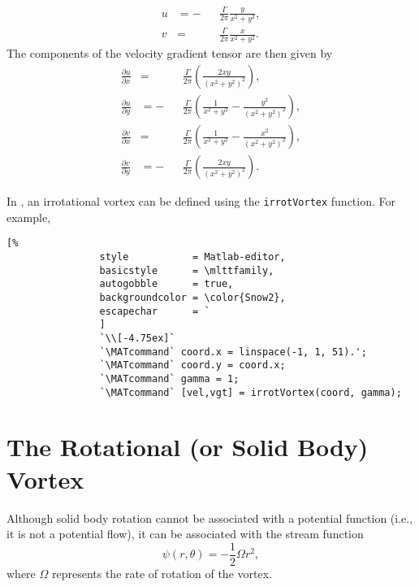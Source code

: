\documentclass[10pt, twoside]{book}
\begin{document}
			\begin{subequations}
				\label{eq:IrrotVortexVel}
				\begin{alignat}{2}
					u &= -&&\frac{\Gamma}{2\pi}\frac{y}{x^2 + y^2},\label{eq:IrrotVortexVelPolarU}\\
					v &=  &&\frac{\Gamma}{2\pi}\frac{x}{x^2 + y^2}.\label{eq:IrrotVortexVelPolarV}
				\end{alignat}
			\end{subequations}
			The components of the velocity gradient tensor are then given by
			\begin{subequations}
			\label{eq:IrrotVortexVgt}
				\begin{alignat}{2}
					\frac{\partial u}{\partial x} &= &&\frac{\Gamma}{2\pi}\left(\frac{2xy}{\left(x^2 + y^2\right)^2}\right),\label{eq:IrrotVortexVgtUx}\\
					\frac{\partial u}{\partial y} &= -&&\frac{\Gamma}{2\pi}\left(\frac{1}{x^2 + y^2} - \frac{y^2}{\left(x^2 + y^2\right)^2}\right),\label{eq:IrrotVortexVgtUy}\\
					\frac{\partial v}{\partial x} &= &&\frac{\Gamma}{2\pi}\left(\frac{1}{x^2 + y^2} - \frac{x^2}{\left(x^2 + y^2\right)^2}\right),\label{eq:IrrotVortexVgtVx}\\
					\frac{\partial v}{\partial y} &= -&&\frac{\Gamma}{2\pi}\left(\frac{2xy}{\left(x^2 + y^2\right)^2}\right).\label{eq:IrrotVortexVgtVy}
				\end{alignat}
			\end{subequations}
			
			
			In \MATfluids, an irrotational vortex can be defined using the \texttt{irrotVortex} function. For example,
			\begin{lstlisting}[%
				style           = Matlab-editor,
				basicstyle      = \mlttfamily,
				autogobble      = true,
				backgroundcolor = \color{Snow2},
				escapechar      = `
				]
				`\\[-4.75ex]`
				`\MATcommand` coord.x = linspace(-1, 1, 51).';
				`\MATcommand` coord.y = coord.x;
				`\MATcommand` gamma = 1;
				`\MATcommand` [vel,vgt] = irrotVortex(coord, gamma);
			\end{lstlisting}
			
		\section{\label{sec:RotVortex}The Rotational (or Solid Body) Vortex}
			
			Although solid body rotation cannot be associated with a potential function (i.e., it is not a potential flow), it can be associated with the stream function
			\begin{equation}
			\label{eq:RotVortexStreamPol}
				\psi\left(r,\theta\right) = -\frac{1}{2}\Omega r^2,
			\end{equation}
			where $\Omega$ represents the rate of rotation of the vortex.
			
\end{document}
